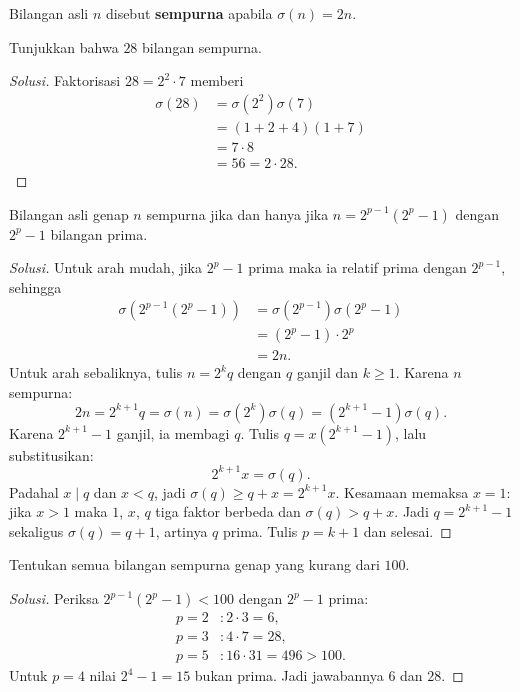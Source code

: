 \documentclass[12pt]{scrartcl}
\begin{document}
\begin{definition}
Bilangan asli $n$ disebut \textbf{sempurna} apabila $\sigma(n) = 2n$.
\end{definition}

\begin{example}
Tunjukkan bahwa $28$ bilangan sempurna.
\end{example}
\begin{proof}[Solusi]
Faktorisasi $28 = 2^2 \cdot 7$ memberi
\begin{align*}
\sigma(28) &= \sigma(2^2)\sigma(7) \\
&= (1 + 2 + 4)(1 + 7) \\
&= 7 \cdot 8 \\
&= 56 = 2 \cdot 28.
\end{align*}
\end{proof}

\begin{theorem}
Bilangan asli genap $n$ sempurna jika dan hanya jika
$n = 2^{p-1}(2^p - 1)$ dengan $2^p - 1$ bilangan prima.
\end{theorem}

\begin{proof}[Solusi]
Untuk arah mudah, jika $2^p - 1$ prima maka ia relatif prima dengan $2^{p-1}$,
sehingga
\begin{align*}
\sigma(2^{p-1}(2^p - 1)) &= \sigma(2^{p-1})\sigma(2^p - 1) \\
&= (2^p - 1) \cdot 2^p \\
&= 2n.
\end{align*}
Untuk arah sebaliknya, tulis $n = 2^k q$ dengan $q$ ganjil dan $k \ge 1$.
Karena $n$ sempurna:
\[ 2n = 2^{k+1}q = \sigma(n) = \sigma(2^k)\sigma(q) = (2^{k+1} - 1)\sigma(q). \]
Karena $2^{k+1} - 1$ ganjil, ia membagi $q$.
Tulis $q = x(2^{k+1} - 1)$, lalu substitusikan:
\[ 2^{k+1}x = \sigma(q). \]
Padahal $x \mid q$ dan $x < q$, jadi $\sigma(q) \ge q + x = 2^{k+1}x$.
Kesamaan memaksa $x = 1$: jika $x > 1$ maka $1$, $x$, $q$ tiga faktor berbeda
dan $\sigma(q) > q + x$. Jadi $q = 2^{k+1} - 1$ sekaligus $\sigma(q) = q + 1$,
artinya $q$ prima. Tulis $p = k + 1$ dan selesai.
\end{proof}

\begin{example}
Tentukan semua bilangan sempurna genap yang kurang dari $100$.
\end{example}
\begin{proof}[Solusi]
Periksa $2^{p-1}(2^p - 1) < 100$ dengan $2^p - 1$ prima:
\begin{align*}
p = 2 &: 2 \cdot 3 = 6, \\
p = 3 &: 4 \cdot 7 = 28, \\
p = 5 &: 16 \cdot 31 = 496 > 100.
\end{align*}
Untuk $p = 4$ nilai $2^4 - 1 = 15$ bukan prima.
Jadi jawabannya $6$ dan $28$.
\end{proof}
\end{document}
